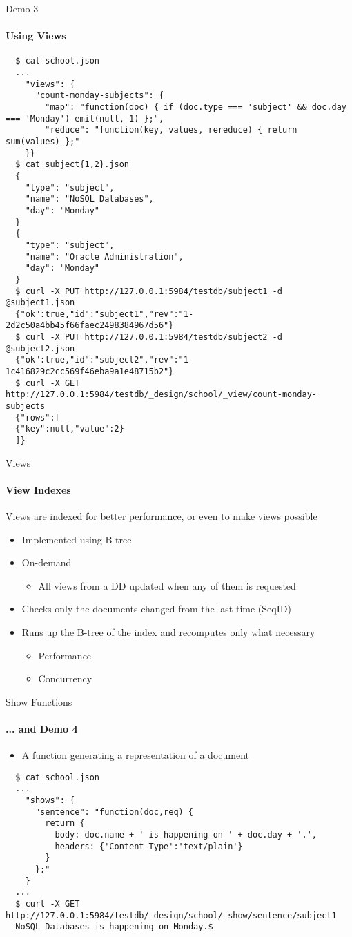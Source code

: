\documentclass{beamer}
\begin{document}
\begin{frame}[fragile]{Demo 3}
  \framesubtitle{Using Views}
  \fontsize{6}{8}\selectfont
  \begin{verbatim}
  $ cat school.json 
  ...
    "views": {
      "count-monday-subjects": {
        "map": "function(doc) { if (doc.type === 'subject' && doc.day === 'Monday') emit(null, 1) };",
        "reduce": "function(key, values, rereduce) { return sum(values) };"
    }}
  $ cat subject{1,2}.json 
  {
    "type": "subject",
    "name": "NoSQL Databases",
    "day": "Monday"
  }
  {
    "type": "subject",
    "name": "Oracle Administration",
    "day": "Monday"
  }
  $ curl -X PUT http://127.0.0.1:5984/testdb/subject1 -d @subject1.json
  {"ok":true,"id":"subject1","rev":"1-2d2c50a4bb45f66faec2498384967d56"}
  $ curl -X PUT http://127.0.0.1:5984/testdb/subject2 -d @subject2.json
  {"ok":true,"id":"subject2","rev":"1-1c416829c2cc569f46eba9a1e48715b2"}
  $ curl -X GET http://127.0.0.1:5984/testdb/_design/school/_view/count-monday-subjects
  {"rows":[
  {"key":null,"value":2}
  ]}
  \end{verbatim}
\end{frame}

\begin{frame}{Views}
  \framesubtitle{View Indexes}
  Views are indexed for better performance, or even to make views possible
  \begin{itemize}
    \item Implemented using B-tree
    \item On-demand
    \begin{itemize}
      \item All views from a DD updated when any of them is requested
    \end{itemize}
    \item Checks only the documents changed from the last time (SeqID)
    \item Runs up the B-tree of the index and recomputes only what necessary
    \begin{itemize}
      \item Performance
      \item Concurrency
    \end{itemize}
  \end{itemize}
\end{frame}

\begin{frame}[fragile]{Show Functions}
  \framesubtitle{... and Demo 4}
  \begin{itemize}
    \item A function generating a representation of a document
  \end{itemize}
  \fontsize{6}{8}\selectfont
  \begin{verbatim}
  $ cat school.json
  ...
    "shows": {
      "sentence": "function(doc,req) { 
        return {
          body: doc.name + ' is happening on ' + doc.day + '.',
          headers: {'Content-Type':'text/plain'}
        }
      };"
    }
  ...
  $ curl -X GET http://127.0.0.1:5984/testdb/_design/school/_show/sentence/subject1
  NoSQL Databases is happening on Monday.$
  \end{verbatim}
\end{frame}
\end{document}
